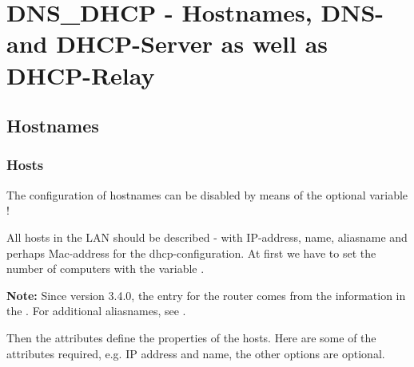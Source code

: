 
{
\section{DNS\_DHCP - Hostnames, DNS- and DHCP-Server as well as DHCP-Relay}
}
\subsection{Hostnames}
\subsubsection{Hosts}
\begin{description}


    The configuration of hostnames can be disabled by means of the optional
    variable !


    {All hosts in the LAN should be described - with IP-address, name,
     aliasname and perhaps Mac-address for the dhcp-configuration.
     At first we have to set the number of computers with the
     variable .

      \textbf{Note: } Since version 3.4.0, the entry for the
       router comes from the information in the .
       For additional aliasnames, see .

      Then the attributes define the properties of the hosts. Here are some of
      the attributes required, e.g. IP address and name, the other options are optional.

}
\end{description}
